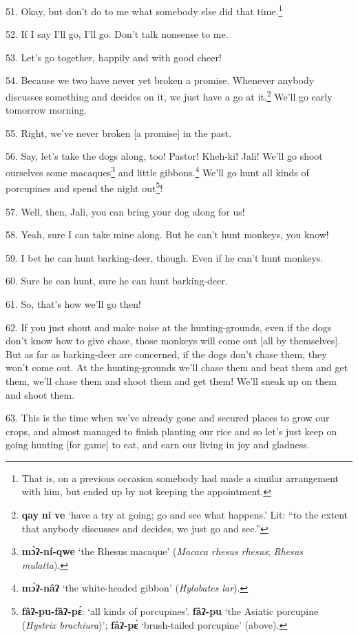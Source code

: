 51. Okay, but don't do to me what somebody else did that time.\footnote{That is, on a previous occasion somebody had made a similar arrangement with him, but ended up by not keeping the appointment.}

52. If I say I'll go, I'll go. Don't talk nonsense to me.

53. Let's go together, happily and with good cheer!

54. Because we two have never yet broken a promise. Whenever anybody discusses
something and decides on it, we just have a go at it.\footnote{\textbf{qay} \textbf{ni} \textbf{ve} `have a try at going; go and see what happens.' Lit: ``to the extent that anybody discusses and decides, we just go and see.''} We'll go early tomorrow
morning.

55. Right, we've never broken [a promise] in the past.

56. Say, let's take the dogs along, too! Pastor! Kheh-ki! Jali! We'll go shoot
ourselves some macaques\footnote{\textbf{mɔ̀ʔ-ní-qwe} `the Rhesus macaque' (\textit{Macaca rhesus rhesus}; \textit{Rhesus mulatta}).} and little gibbons.\footnote{\textbf{mɔ̀ʔ-nâʔ} `the white-headed gibbon' (\textit{Hylobates lar}).} We'll go hunt all kinds of
porcupines and spend the night out\footnote{\textbf{fâʔ-pu-fâʔ-pɛ́}: `all kinds of porcupines'. \textbf{fâʔ-pu} `the Asiatic porcupine (\textit{Hystrix brachiura})'; \textbf{fâʔ-pɛ́} `brush-tailed porcupine' (above).}!

57. Well, then, Jali, you can bring your dog along for us!

58. Yeah, sure I can take mine along. But he can't hunt monkeys, you know!

59. I bet he can hunt barking-deer, though. Even if he can't hunt monkeys.

60. Sure he can hunt, sure he can hunt barking-deer.

61. So, that's how we'll go then!

62. If you just shout and make noise at the hunting-grounds, even if the dogs don't
know how to give chase, those monkeys will come out [all by themselves]. But as
far as barking-deer are concerned, if the dogs don't chase them, they won't come
out. At the hunting-grounds we'll chase them and beat them and get them, we'll
chase them and shoot them and get them! We'll sneak up on them and shoot them.

63. This is the time when we've already gone and secured places to grow our crops,
and almost managed to finish planting our rice and so let's just keep on going
hunting [for game] to eat, and earn our living in joy and gladness.

